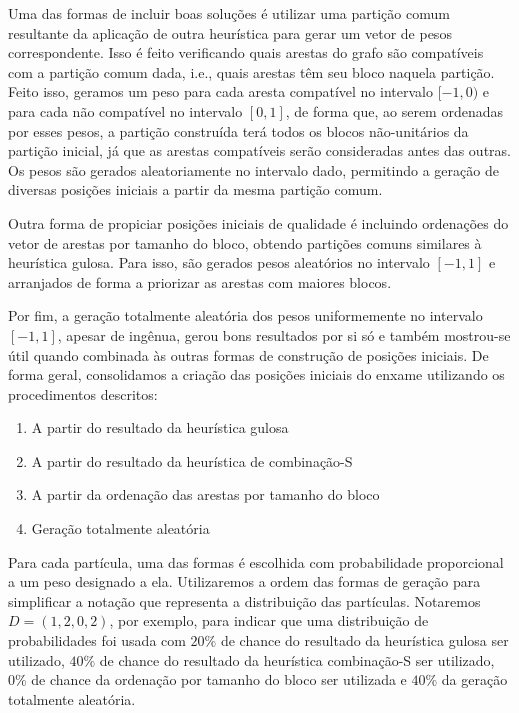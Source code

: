     Uma das formas de incluir boas soluções é utilizar uma partição comum resultante da aplicação de outra heurística para gerar um vetor de pesos correspondente. Isso é feito verificando quais arestas do grafo são compatíveis com a partição comum dada, i.e., quais arestas têm seu bloco naquela partição. Feito isso, geramos um peso para cada aresta compatível no intervalo $[-1,0)$ e para cada não compatível no intervalo $[0, 1]$, de forma que, ao serem ordenadas por esses pesos, a partição construída terá todos os blocos não-unitários da partição inicial, já que as arestas compatíveis serão consideradas antes das outras. Os pesos são gerados aleatoriamente no intervalo dado, permitindo a geração de diversas posições iniciais a partir da mesma partição comum.

    Outra forma de propiciar posições iniciais de qualidade é incluindo ordenações do vetor de arestas por tamanho do bloco, obtendo partições comuns similares à heurística gulosa. Para isso, são gerados pesos aleatórios no intervalo $[-1,1]$ e arranjados de forma a priorizar as arestas com maiores blocos.

    Por fim, a geração totalmente aleatória dos pesos uniformemente no intervalo $[-1,1]$, apesar de ingênua, gerou bons resultados por si só e também mostrou-se útil quando combinada às outras formas de construção de posições iniciais. De forma geral, consolidamos a criação das posições iniciais do enxame utilizando os procedimentos descritos:

    \begin{enumerate}[
        label = {\alph*)},
        parsep = 0pt,
        itemsep = 0.2em,
        topsep = 0pt
    ]
        \item A partir do resultado da heurística gulosa
        \item A partir do resultado da heurística de combinação-S
        \item A partir da ordenação das arestas por tamanho do bloco
        \item Geração totalmente aleatória
    \end{enumerate}

    Para cada partícula, uma das formas é escolhida com probabilidade proporcional a um peso designado a ela. Utilizaremos a ordem das formas de geração para simplificar a notação que representa a distribuição das partículas. Notaremos $D = (1, 2, 0, 2)$, por exemplo, para indicar que uma distribuição de probabilidades foi usada com $20\%$ de chance do resultado da heurística gulosa ser utilizado, $40\%$ de chance do resultado da heurística combinação-S ser utilizado, $0\%$ de chance da ordenação por tamanho do bloco ser utilizada e $40\%$ da geração totalmente aleatória.

